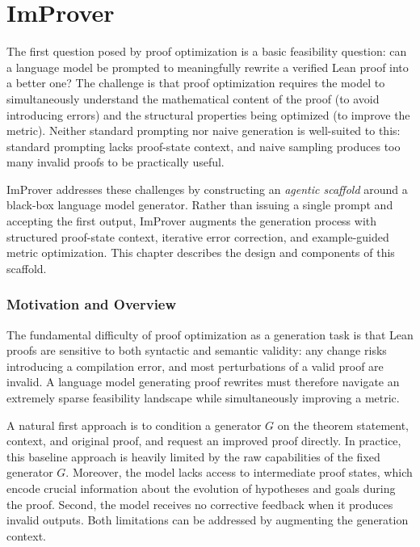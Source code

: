 \chapter{ImProver}\label{chap:improver}

\setlength{\parindent}{1em}

The first question posed by proof optimization is a basic feasibility question: can a language model be prompted to meaningfully rewrite a verified Lean proof into a better one? The challenge is that proof optimization requires the model to simultaneously understand the mathematical content of the proof (to avoid introducing errors) and the structural properties being optimized (to improve the metric). Neither standard prompting nor naive generation is well-suited to this: standard prompting lacks proof-state context, and naive sampling produces too many invalid proofs to be practically useful.

ImProver addresses these challenges by constructing an \emph{agentic scaffold} around a black-box language model generator. Rather than issuing a single prompt and accepting the first output, ImProver augments the generation process with structured proof-state context, iterative error correction, and example-guided metric optimization. This chapter describes the design and components of this scaffold.

\subsection{Motivation and Overview}
\label{ssec:improver_overview}

The fundamental difficulty of proof optimization as a generation task is that Lean proofs are sensitive to both syntactic and semantic validity: any change risks introducing a compilation error, and most perturbations of a valid proof are invalid. A language model generating proof rewrites must therefore navigate an extremely sparse feasibility landscape while simultaneously improving a metric.

A natural first approach is to condition a generator $G$ on the theorem statement, context, and original proof, and request an improved proof directly. In practice, this baseline approach is heavily limited by the raw capabilities of the fixed generator $G$. Moreover, the model lacks access to intermediate proof states, which encode crucial information about the evolution of hypotheses and goals during the proof. Second, the model receives no corrective feedback when it produces invalid outputs. Both limitations can be addressed by augmenting the generation context.

